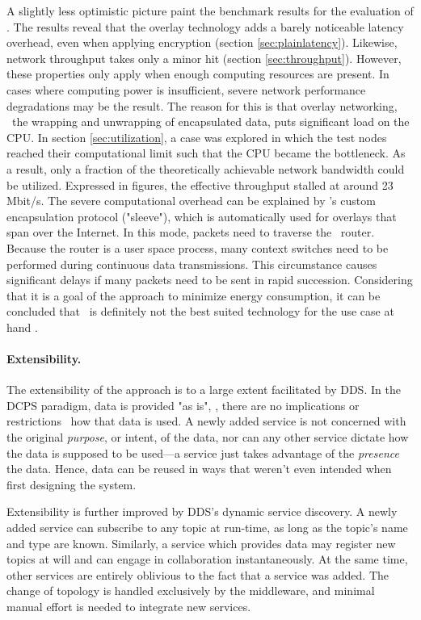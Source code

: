 A slightly less optimistic picture paint the benchmark results for the evaluation of \wnet . The results reveal that the overlay technology adds a barely noticeable latency overhead, even when applying encryption (\cf section \ref{sec:plainlatency}). Likewise, network throughput takes only a minor hit (\cf section \ref{sec:throughput}). However, these properties only apply when enough computing resources are present. In cases where computing power is insufficient, severe network performance degradations may be the result. The reason for this is that overlay networking, \ie\ the wrapping and unwrapping of encapsulated data, puts significant load on the CPU. In section \ref{sec:utilization}, a case was explored in which the test nodes reached their computational limit such that the CPU became the bottleneck. As a result, only a fraction of the theoretically achievable network bandwidth could be utilized. Expressed in figures, the effective throughput stalled at around 23 Mbit/s. The severe computational overhead can be explained by \weave 's custom encapsulation protocol ("sleeve"), which is automatically used for overlays that span over the Internet. In this mode, packets need to traverse the \weave\ router. Because the router is a user space process, many context switches need to be performed during continuous data transmissions. This circumstance causes significant delays if many packets need to be sent in rapid succession. Considering that it is a goal of the approach to minimize energy consumption, it can be concluded that \wnet\ is definitely not the best suited technology for the use case at hand .

\paragraph{Extensibility.}
The extensibility of the approach is to a large extent facilitated by DDS. In the DCPS paradigm, data is provided "as is", \ie , there are no implications or restrictions \wrt\ how that data is used. A newly added service is not concerned with the original \emph{purpose}, or intent, of the data, nor can any other service dictate how the data is supposed to be used---a service just takes advantage of the \emph{presence} the data. Hence, data can be reused in ways that weren't even intended when first designing the system.

Extensibility is further improved by DDS's dynamic service discovery. A newly added service can subscribe to any topic at run-time, as long as the topic's name and type are known. Similarly, a service which provides data may register new topics at will and can engage in collaboration instantaneously. At the same time, other services are entirely oblivious to the fact that a service was added. The change of topology is handled exclusively by the middleware, and minimal manual effort is needed to integrate new services.

